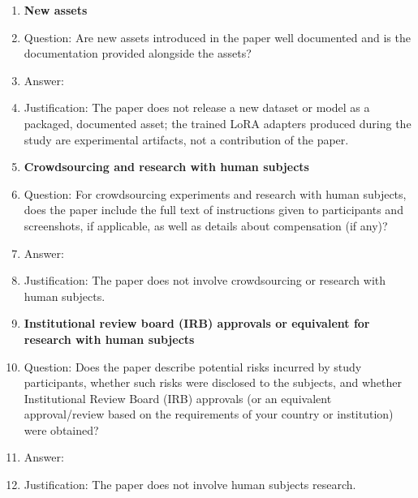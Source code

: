 \begin{enumerate}
\item {\bf New assets}
    \item[] Question: Are new assets introduced in the paper well documented and is the documentation provided alongside the assets?
    \item[] Answer: \answerNA{}
    \item[] Justification: The paper does not release a new dataset or model as a packaged, documented asset; the trained LoRA adapters produced during the study are experimental artifacts, not a contribution of the paper.

\item {\bf Crowdsourcing and research with human subjects}
    \item[] Question: For crowdsourcing experiments and research with human subjects, does the paper include the full text of instructions given to participants and screenshots, if applicable, as well as details about compensation (if any)?
    \item[] Answer: \answerNA{}
    \item[] Justification: The paper does not involve crowdsourcing or research with human subjects.

\item {\bf Institutional review board (IRB) approvals or equivalent for research with human subjects}
    \item[] Question: Does the paper describe potential risks incurred by study participants, whether such risks were disclosed to the subjects, and whether Institutional Review Board (IRB) approvals (or an equivalent approval/review based on the requirements of your country or institution) were obtained?
    \item[] Answer: \answerNA{}
    \item[] Justification: The paper does not involve human subjects research.


\end{enumerate}
